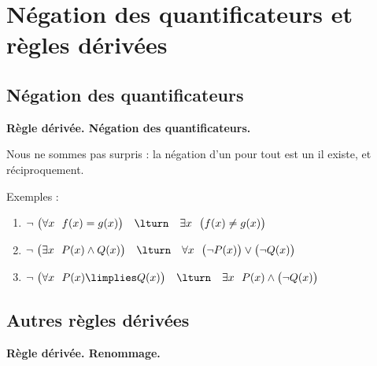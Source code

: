 \documentclass[11pt,class=report,crop=false]{standalone}
\begin{document}
\section{Négation des quantificateurs et règles dérivées}

\subsection{Négation des quantificateurs}


\textbf{Règle dérivée. Négation des quantificateurs.} 

Nous ne sommes pas surpris : la négation d'un \og{}pour tout\fg{} est un \og{}il existe\fg{}, et réciproquement.

Exemples :
\begin{enumerate}
	
	\item $\lnot \ \big( \forall x \ \ f(x) = g(x) \big) \quad \lturn \quad  
	\exists x \ \ \big( f(x) \neq g(x) \big)$
	
	\item $\lnot \ \big( \exists x \ \ P(x) \land Q(x) \big) \quad \lturn \quad  
	\forall x \ \ \big( \lnot P(x) \big) \lor \big( \lnot Q(x) \big)$
	
	\item $\lnot \ \big( \forall x \ \ P(x) \limplies Q(x) \big) \quad \lturn \quad \exists x \ \ P(x) \land \big( \lnot Q(x) \big)$
\end{enumerate}


\subsection{Autres règles dérivées}


\textbf{Règle dérivée. Renommage.} 
\end{document}
